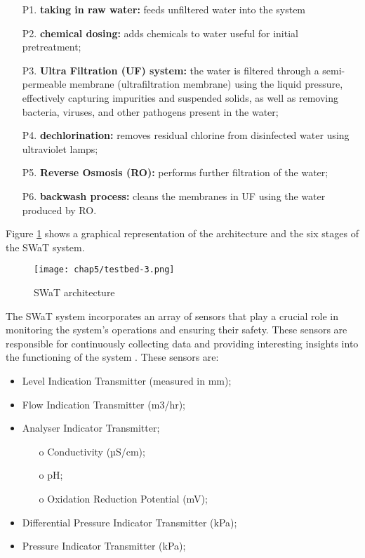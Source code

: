 \begin{enumerate}
	\item[P1.] \textbf{taking in raw water:} feeds unfiltered water into the system
	
	\item[P2.] \textbf{chemical dosing:} adds chemicals to water useful for initial pretreatment;
	
	\item[P3.] \textbf{Ultra Filtration (UF) system:} the water is filtered through a semi-permeable membrane (ultrafiltration membrane) using the liquid pressure, effectively capturing impurities and suspended solids, as well as removing bacteria, viruses, and other pathogens present in the water;
	
	\item[P4.] \textbf{dechlorination:} removes residual chlorine from disinfected water using ultraviolet lamps;
	
	\item[P5.] \textbf{Reverse Osmosis (RO):} performs further filtration of the water;
	
	\item[P6.] \textbf{backwash process:} cleans the membranes in UF using the water produced by RO.
	
\end{enumerate}

\noindent Figure \ref{fig:5_swat_architecture_1} \cite{swat_home} shows a graphical representation of the architecture and the six stages of the SWaT system.

\begin{figure}[ht]
	\centering
	\texttt{[image: chap5/testbed-3.png]}
	\caption{SWaT architecture}
	\label{fig:5_swat_architecture_1}
\end{figure}

\bigskip
The SWaT system incorporates an array of sensors that play a crucial role in monitoring the system's operations and ensuring their safety. These sensors are responsible for continuously collecting data and providing interesting insights into the functioning of the system \cite{swat_tecnical_pdf}. These sensors are:

\begin{itemize}
	\item Level Indication Transmitter (measured in mm);
	\item Flow Indication Transmitter (m3/hr);
	\item Analyser Indicator Transmitter;
	\begin{itemize}
		\item[o] Conductivity (µS/cm);
		\item[o] pH;
		\item[o] Oxidation Reduction Potential (mV);
	\end{itemize}
	\item Differential Pressure Indicator Transmitter (kPa);
	\item Pressure Indicator Transmitter (kPa);
\end{itemize}


